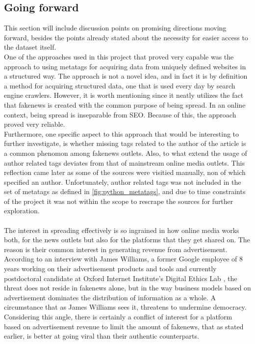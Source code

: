 \documentclass{article}
\begin{document}
\subsection{Going forward}
This section will include discussion points on promising directions moving forward, besides the points already stated about the necessity for easier access to the dataset itself. \\
One of the approaches used in this project that proved very capable was the approach to using metatags for acquiring data from uniquely defined websites in a structured way. The approach is not a novel idea, and in fact it is by definition a method for acquiring structured data, one that is used every day by search engine crawlers. However, it is worth mentioning since it neatly utilizes the fact that fakenews is created with the common purpose of being spread. In an online context, being spread is inseparable from SEO. Because of this, the approach proved very reliable.
\\
Furthermore, one specific aspect to this approach that would be interesting to further investigate, is whether missing tags related to the author of the article is a common phenomon among fakenews outlets. Also, to what extend the usage of author related tags deviates from that of mainstream online media outlets. 
This reflection came later as some of the sources were visitied manually, non of which specified an author.
Unfortunately, author related tags was not included in the set of metatags as defined in \cref{fig:python_metatags}, and due to time constraints of the project it was not within the scope to rescrape the sources for further exploration.
\\\\
The interest in spreading effectively is so ingrained in how online media works both, for the news outlets but also for the platforms that they get shared on. The reason is their common interest in generating revenue from advertisement. According to an interview with James Williams, a former Google employee of 8 years working on their advertisement products and tools and currently postdoctoral candidate at Oxford Internet Institute's Digital Ethics Lab \cite{jamesfuckingwilliamseveryone}, the threat does not reside in fakenews alone, but in the way business models based on advertisement dominates the distribution of information as a whole. A circumstance that as James Williams sees it, threatens to undermine democracy. Considering this angle, there is certainly a conflict of interest for a platform based on advertisement revenue to limit the amount of fakenews, that as stated earlier, is better at going viral than their authentic counterparts.
\end{document}
